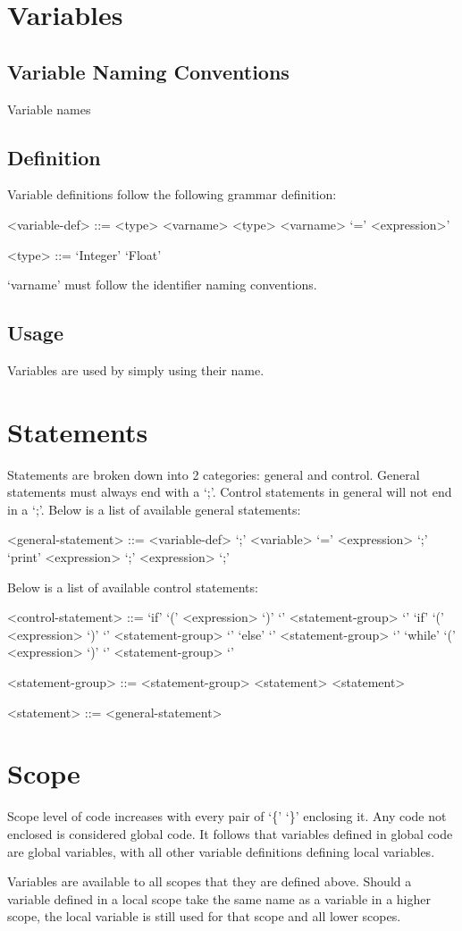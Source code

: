 \documentclass{standalone}
\begin{document}
	\section{Variables}
		\subsection{Variable Naming Conventions}
			Variable names
		\subsection{Definition}
			Variable definitions follow the following grammar definition:
			\begin{grammar}
				<variable-def> ::= <type> <varname>
					\alt <type> <varname> `=' <expression>'

				<type> ::= `Integer'
					\alt `Float'
			\end{grammar}
			`varname' must follow the identifier naming conventions.
		\subsection{Usage}
			Variables are used by simply using their name.
	
	\section{Statements}
		Statements are broken down into 2 categories: general and control. General statements must always end with a `;'. Control statements in general will not end in a `;'.
		Below is a list of available general statements:
		\begin{grammar}
			<general-statement> ::= <variable-def> `;'
				\alt <variable> `=' <expression> `;'
				\alt `print' <expression> `;'
				 `;'
		\end{grammar}
		Below is a list of available control statements:
		\begin{grammar}
			<control-statement> ::= 
				`if' `(' <expression> `)' `{' <statement-group> `}'
				\alt `if' `(' <expression> `)' `{' <statement-group> `}' `else' `{' <statement-group> `}'
				\alt `while' `(' <expression> `)' `{' <statement-group> `}'
		
			<statement-group> ::= <statement-group> <statement>

			<statement> ::= <general-statement>
				\alt <control-statement>
	
		\end{grammar}

	\section{Scope}
		Scope level of code increases with every pair of `\{' `\}' enclosing it. Any code not enclosed is considered global code. It follows that variables defined in global code are global variables, with all other variable definitions defining local variables.

		Variables are available to all scopes that they are defined above. Should a variable defined in a local scope take the same name as a variable in a higher scope, the local variable is still used for that scope and all lower scopes.
\end{document}
